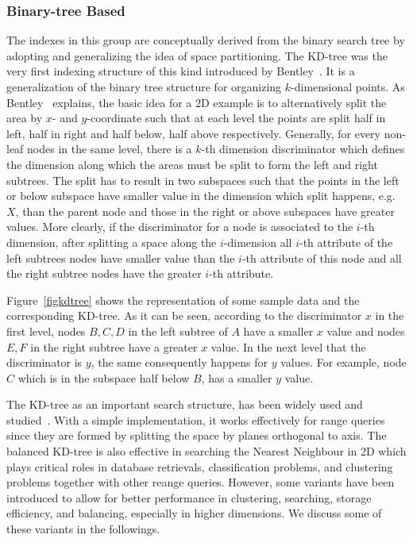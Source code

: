 \documentclass[a4paper,12pt]{article}
\begin{document}
\subsubsection{Binary-tree Based}
\label{binary-tree-based}
The indexes in this group are conceptually derived from the binary search tree by adopting and generalizing the idea of space partitioning. 
The KD-tree was the very first indexing structure of this kind introduced by Bentley~\cite{bently1975}. 
It is a generalization of the binary tree structure for organizing $k$-dimensional points. As Bentley~\cite{bently1975} explains, the basic idea for a 2D example is to alternatively split the area by $x$- and $y$-coordinate such that at each level the points are split half in left, half in right and half below, half above respectively. Generally, for every non-leaf nodes in the same level, there is a $k$-th dimension discriminator which defines the dimension along which the areas must be split to form the left and right subtrees. The split has to result in two subspaces such that the points in the left or below subspace have smaller value in the dimension which split happens, e.g. $X$, than the parent node and those in the right or above subspaces have greater values. More clearly, if the discriminator for a node is associated to the $i$-th dimension, after splitting a space along the $i$-dimension all $i$-th attribute of the left subtrees nodes have smaller value than the $i$-th attribute of this node and all the right subtree nodes have the greater $i$-th attribute. 

Figure~\ref{figkdtree} shows the representation of some sample data and the corresponding KD-tree. As it can be seen, according to the discriminator $x$ in the first level, nodes $B, C, D$ in the left subtree of $A$ have a smaller $x$ value and nodes $E, F$ in the right subtree have a greater $x$ value. In the next level that the discriminator is $y$, the same consequently happens for $y$ values. For example, node $C$ which is in the subspace half below $B$, has a smaller $y$ value.

The KD-tree as an important search structure, has been widely used and studied~\cite{ilprints723}. With a simple implementation, it works effectively for range queries since they are formed by splitting the space by planes orthogonal to axis. The balanced KD-tree is also effective in searching the Nearest Neighbour in 2D which plays critical roles in database retrievals, classification problems, and clustering problems together with other reange queries. However, some variants have been introduced to allow for better performance in clustering, searching, storage efficiency,  
and balancing, especially in higher dimensions. We discuss some of these variants in the followings.
\end{document}
